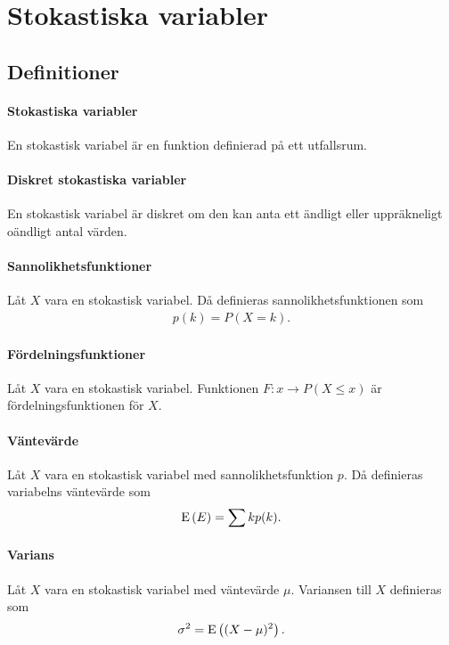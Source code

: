 \section{Stokastiska variabler}

\subsection{Definitioner}

\paragraph{Stokastiska variabler}
En stokastisk variabel är en funktion definierad på ett utfallsrum.

\paragraph{Diskret stokastiska variabler}
En stokastisk variabel är diskret om den kan anta ett ändligt eller uppräkneligt oändligt antal värden.

\paragraph{Sannolikhetsfunktioner}
Låt $X$ vara en stokastisk variabel. Då definieras sannolikhetsfunktionen som
\begin{align*}
	p(k) = P(X = k).
\end{align*}

\paragraph{Fördelningsfunktioner}
Låt $X$ vara en stokastisk variabel. Funktionen $F: x\to P(X\leq x)$ är fördelningsfunktionen för $X$.

\paragraph{Väntevärde}
Låt $X$ vara en stokastisk variabel med sannolikhetsfunktion $p$. Då definieras variabelns väntevärde som
\begin{align*}
	\text{E}\left(E\right) = \sum kp(k).
\end{align*}

\paragraph{Varians}
Låt $X$ vara en stokastisk variabel med väntevärde $\mu$. Variansen till $X$ definieras som
\begin{align*}
	\sigma^2 = \text{E}\left((X - \mu)^2\right).
\end{align*}

